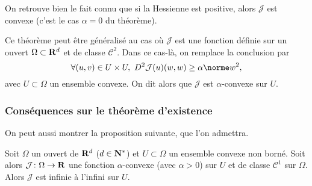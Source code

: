 \documentclass[grape]{../ceri/sty/MasterNotes}
\newcommand\J{\mathcal J}
\begin{document}
\begin{rems}
    \item On retrouve bien le fait connu que si la Hessienne est positive, alors $\J$ est convexe (c'est le cas $\alpha=0$ du théorème).
    \item Ce théorème peut être généralisé au cas où $\J$ est une fonction définie sur un ouvert $\Omega\subset\mathbf{R}^d$ et de classe $\mathcal C^2$. Dans ce cas-là, on remplace la conclusion par
    \[ \forall (u,v)\in U\times U,\ D^2\J(u)(w,w)\ge\alpha\norme w^2, \]
    avec $U\subset\Omega$ un ensemble convexe. On dit alors que $\J$ est $\alpha$-convexe sur $U$.
\end{rems}

\subsubsection{Conséquences sur le théorème d'existence}

On peut aussi montrer la proposition suivante, que l'on admettra.

\begin{propo}
    Soit $\Omega$ un ouvert de $\mathbf{R}^d$ ($d\in\mathbf{N}^*$) et $U\subset\Omega$ un ensemble convexe non borné. Soit alors $\J\colon\Omega\to\R$ une fonction $\alpha$-convexe (avec $\alpha>0$) sur $U$ et de classe $\mathcal C^1$ sur $\Omega$. Alors $\J$ est infinie à l'infini sur $U$.
\end{propo}
\end{document}
